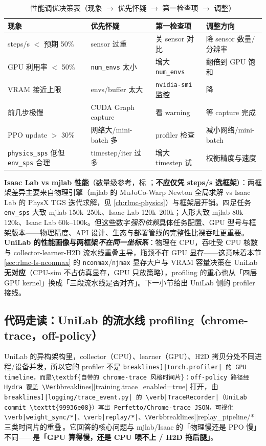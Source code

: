 \begin{table}[H]\centering\small
\caption{性能调优决策表（现象 $\to$ 优先怀疑 $\to$ 第一检查项 $\to$ 调整）}
\label{tab:rlmc-ls-perf-decision}
\begin{tabular}{@{}p{3.2cm}p{2.6cm}p{3.0cm}p{3.0cm}@{}}
\toprule
现象 & 优先怀疑 & 第一检查项 & 调整方向 \\
\midrule
steps/s $<$ 预期 50\% & sensor 过重 & 关 sensor 对比 & 降 sensor 数量/分辨率 \\
GPU 利用率 $<$ 50\% & \verb|num_envs| 太小 & 增大 \verb|num_envs| & 翻倍到 GPU 饱和 \\
VRAM 接近上限 & envs/buffer 太大 & \verb|nvidia-smi| 监控 & 降 \Verb[breaklines]|num_envs/nconmax| \\
前几步极慢 & CUDA Graph capture & 看 warning & 等 capture 完成 \\
PPO update $>$ 30\% & 网络大/mini-batch 多 & profiler 检查 & 减小网络/mini-batch \\
\verb|physics_sps| 低但 \verb|env_sps| 合理 & timestep/iter 过多 & 增大 timestep 试 & 权衡精度与速度 \\
\bottomrule
\end{tabular}
\end{table}

\textbf{Isaac Lab vs mjlab 性能}（数量级参考，标 ；\textbf{不应仅凭 steps/s 选框架}）：两框架差异主要来自物理引擎（mjlab 的 MuJoCo-Warp Newton 全局求解 vs Isaac Lab 的 PhysX TGS 迭代求解，见 \cref{ch:rlmc-physics}）与框架层开销。四足任务 \verb|env_sps| 大致 mjlab 150k--250k、Isaac Lab 120k--200k；人形大致 mjlab 80k--120k、Isaac Lab 60k--100k。但这些数字\emph{强烈依赖}具体任务配置、GPU 型号与框架版本——物理精度、API 设计、生态与部署管线的完整性比裸吞吐更重要。\textbf{UniLab 的性能画像与两框架\emph{不在同一坐标系}}：物理在 CPU，吞吐受 CPU 核数与 collector-learner-H2D 流水线重叠主导，瓶颈不在 GPU 显存——这意味着本节 \cref{sec:rlmc-ls-nconmax} 的 \verb|nconmax|/\allowbreak\verb|njmax| 显存大户与 VRAM 容量决策在 UniLab \textbf{无对应}（CPU-sim 不占仿真显存，GPU 只放策略），profiling 的重心也从「四层 GPU kernel」换成「三段流水线是否对齐」。下一小节给出 UniLab 侧的 profiler 接线。

\subsection{代码走读：UniLab 的流水线 profiling（chrome-trace，off-policy）}
\label{sec:rlmc-ls-unilab-perf}

UniLab 的异构架构里，collector（CPU）、learner（GPU）、H2D 拷贝分处不同进程/设备并发，所以它的 profiler 不是 \Verb[breaklines]|torch.profiler| 的 GPU timeline，而是\textbf{自带的 chrome-trace 风格时间片}：off-policy 路径经 Hydra 覆盖 \Verb[breaklines]|training.trace_enabled=true| 打开，由 \Verb[breaklines]|logging/trace_event.py| 的 \verb|TraceRecorder|（UniLab commit \texttt{99936e08}）写出 Perfetto/Chrome-trace JSON，可视化 \verb|weight_sync/*|、\verb|replay/*|、\Verb[breaklines]|replay_pipeline/*| 三类时间片的重叠\,\cite{unilab2026}。它回答的核心问题与 mjlab/Isaac 的「物理慢还是 PPO 慢」不同——是\textbf{「GPU 算得慢，还是 CPU 喂不上 / H2D 拖后腿」}。

